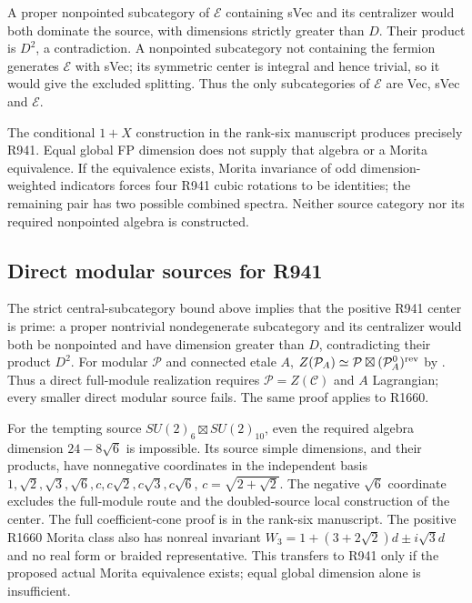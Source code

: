 A proper nonpointed subcategory of $\mathcal E$ containing sVec and its
centralizer would both dominate the source, with dimensions strictly
greater than $D$. Their product is $D^2$, a contradiction. A nonpointed
subcategory not containing the fermion generates $\mathcal E$ with
sVec; its symmetric center is integral and hence trivial, so it would
give the excluded splitting. Thus the only subcategories of
$\mathcal E$ are Vec, sVec and $\mathcal E$.

The conditional $1+X$ construction in the rank-six manuscript produces
precisely R941. Equal global FP dimension does not supply that algebra
or a Morita equivalence. If the equivalence exists, Morita invariance of
odd dimension-weighted indicators forces four R941 cubic rotations to
be identities; the remaining pair has two possible combined spectra.
Neither source category nor its required nonpointed algebra is
constructed.


\subsection{Direct modular sources for R941}
The strict central-subcategory bound above implies that the positive
R941 center is prime: a proper nontrivial nondegenerate subcategory and
its centralizer would both be nonpointed and have dimension greater
than $D$, contradicting their product $D^2$.
For modular $\mathcal P$ and connected etale $A$,
$Z(\mathcal P_A)\simeq\mathcal P\boxtimes(\mathcal P_A^0)^{\rm rev}$
by \cite[Corollary~3.30]{DMNO}. Thus a direct full-module realization
requires $\mathcal P=Z(\mathcal C)$ and $A$ Lagrangian; every smaller
direct modular source fails. The same proof applies to R1660.

For the tempting source $SU(2)_6\boxtimes SU(2)_{10}$, even the
required algebra dimension $24-8\sqrt6$ is impossible. Its source
simple dimensions, and their products, have nonnegative coordinates
in the independent basis
$1,\sqrt2,\sqrt3,\sqrt6,c,c\sqrt2,c\sqrt3,c\sqrt6$,
$c=\sqrt{2+\sqrt2}$. The negative $\sqrt6$ coordinate excludes the
full-module route and the doubled-source local construction of the
center. The full coefficient-cone proof is in the rank-six manuscript.
The positive R1660 Morita class also has nonreal invariant
$W_3=1+(3+2\sqrt2)d\pm i\sqrt3d$ and no real form or braided
representative. This transfers to R941 only if the proposed actual
Morita equivalence exists; equal global dimension alone is insufficient.
